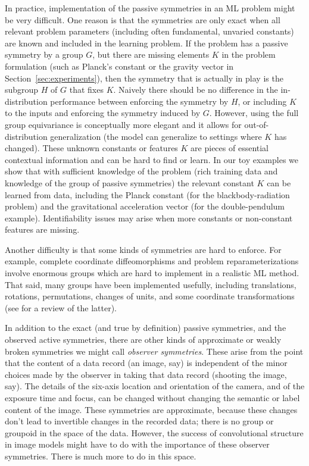 \documentclass{article}
\theoremstyle{plain}
\theoremstyle{definition}
\theoremstyle{remark}
\newcommand{\sectionname}{Section}
\newcommand{\secref}[1]{\sectionname~\ref{#1}}
\begin{document}
In practice, implementation of the passive symmetries in an ML problem might be very difficult.
One reason is that the symmetries are only exact when all relevant problem parameters (including often fundamental, unvaried constants) are known and included in the learning problem.
If the problem has a passive symmetry by a group $G$, but there are missing elements $K$ in the problem formulation (such as Planck's constant or the gravity vector in \secref{sec:experiments}), then the symmetry that is actually in play is the subgroup $H$ of $G$ that fixes $K$. 
Naively there should be no difference in the in-distribution performance between enforcing the symmetry by $H$, or including $K$ to the inputs and enforcing the symmetry induced by $G$. 
However, using the full group equivariance is conceptually more elegant and it allows for out-of-distribution generalization (the model can generalize to settings where  $K$ has changed).
These unknown constants or features $K$ are pieces of essential contextual information and can be hard to find or learn. 
In our toy examples we show that with sufficient knowledge of the problem (rich training data and knowledge of the group of passive symmetries) the relevant constant $K$ can be learned from data, including the Planck constant (for the blackbody-radiation problem) and the gravitational acceleration vector (for the double-pendulum example).
Identifiability issues may arise when more constants or non-constant features are missing.

Another difficulty is that some kinds of symmetries are hard to enforce.
For example, complete coordinate diffeomorphisms and problem reparameterizations involve enormous groups which are hard to implement in a realistic ML method.
That said, many groups have been implemented usefully, including translations, rotations, permutations, changes of units, and some coordinate transformations (see \citealt{weiler} for a review of the latter). 

In addition to the exact (and true by definition) passive symmetries, and the observed active symmetries, there are other kinds of approximate or weakly broken symmetries we might call \emph{observer symmetries}.
These arise from the point that the content of a data record (an image, say) is independent of the minor choices made by the observer in taking that data record (shooting the image, say).
The details of the six-axis location and orientation of the camera, and of the exposure time and focus, can be changed without changing the semantic or label content of the image.
These symmetries are approximate, because these changes don't lead to invertible changes in the recorded data; there is no group or groupoid in the space of the data.
However, the success of convolutional structure in image models might have to do with the importance of these observer symmetries.
There is much more to do in this space.
\end{document}
